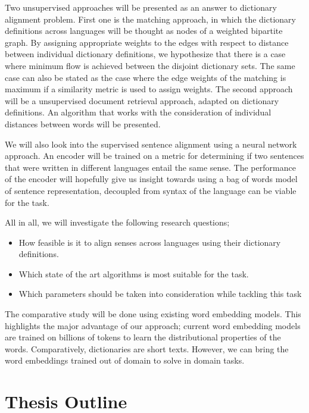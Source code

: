 Two unsupervised approaches will be presented as an answer to dictionary alignment problem.
First one is the matching approach, in which the dictionary definitions across languages will be thought as nodes of a weighted bipartite graph.
By assigning appropriate weights to the edges with respect to distance between individual dictionary definitions, we hypothesize that there is a case where minimum flow is achieved between the disjoint dictionary sets.
The same case can also be stated as the case where the edge weights of the matching is maximum if a similarity metric is used to assign weights.
The second approach will be a unsupervised document retrieval approach, adapted on dictionary definitions.
An algorithm that works with the consideration of individual distances between words will be presented.

We will also look into the supervised sentence alignment using a neural network approach.
An encoder will be trained on a metric for determining if two sentences that were written in different languages entail the same sense.
The performance of the encoder will hopefully give us insight towards using a bag of words model of sentence representation, decoupled from syntax of the language can be viable for the task.

All in all, we will investigate the following research questions;
\begin{itemize}
    \item How feasible is it to align senses across languages using their dictionary definitions.
    \item Which state of the art algorithms is most suitable for the task.
    \item Which parameters should be taken into consideration while tackling this task
\end{itemize}

The comparative study will be done using existing word embedding models.
This highlights the major advantage of our approach;
current word embedding models are trained on billions of tokens to learn the distributional properties of the words.
Comparatively, dictionaries are short texts.
However, we can bring the word embeddings trained out of domain to solve in domain tasks.

\section{Thesis Outline}%
\label{sec:thesis_outline}

